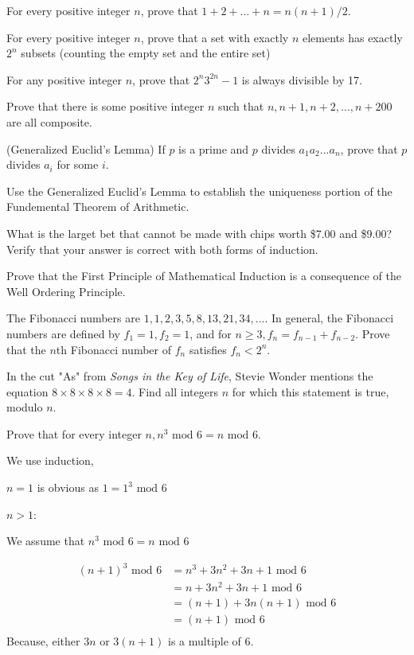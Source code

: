 \documentclass[11pt,largemargins]{homework}
\begin{document}
\question 
For every positive integer $n$, prove that $1+2+...+n=n(n+1)/2$.

\question 
For every positive integer $n$, prove that a set with exactly $n$ elements has exactly $2^n$ subsets (counting the empty 
set and the entire set)

\question 
For any positive integer $n$, prove that $2^n3^{2n}-1$ is always divisible by 17.

\question 
Prove that there is some positive integer $n$ such that $n, n+1, n+2,...,n+200$ are all composite.

\question 
(Generalized Euclid's Lemma) If $p$ is a prime and $p$ divides $a_1a_2...a_n$, prove that $p$ divides $a_i$ for some $i$.

\question 
Use the Generalized Euclid's Lemma to establish the uniqueness portion of the Fundemental Theorem of Arithmetic.

\question What is the larget bet that cannot be made with chips worth \$7.00 and \$9.00? Verify that your answer is 
correct with both forms of induction.

\question 
Prove that the First Principle of Mathematical Induction is a consequence of the Well Ordering Principle.

\question 
The Fibonacci numbers are $1,1,2,3,5,8,13,21,34,...$. In general, the Fibonacci numbers are defined by $f_1=1, f_2=1$, and for 
$n\geq3, f_n=f_{n-1}+f_{n-2}$. Prove that the $n$th Fibonacci number of $f_n$ satisfies $f_n<2^n$.

\question 
In the cut "As" from \textit{Songs in the Key of Life}, Stevie Wonder mentions the equation $8\times8\times8\times8=4$. Find 
all integers $n$ for which this statement is true, modulo $n$.

\question 
Prove that for every integer $n, n^3\text{ mod }6=n\text{ mod }6$.

\quad We use induction,

\quad $n=1$ is obvious as $1=1^3\text{ mod }6$

\quad $n>1$:

We assume that $n^3\text{ mod }6=n\text{ mod }6$

\begin{align*}
    (n+1)^3\text{ mod }6 &= n^3+3n^2+3n+1\text{ mod }6\\
                         &= n + 3n^2+3n+1\text{ mod }6\\
                         &= (n+1) + 3n(n+1)\text{ mod }6\\
                         &= (n+1)\text{ mod }6\\
\end{align*}
\quad Because, either $3n$ or $3(n+1)$ is a multiple of 6.
\end{document}
